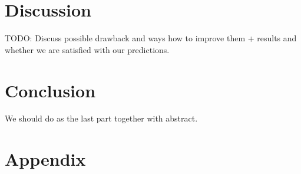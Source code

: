 \documentclass[letterpaper]{article}
\begin{document}
\section{Discussion}\label{sec:discussion}
TODO: Discuss possible drawback and ways how to improve them + results and whether we are satisfied with our predictions.

\section{Conclusion}\label{sec:conclusion}
We should do as the last part together with abstract.





\newpage
\section{Appendix}
\end{document}
